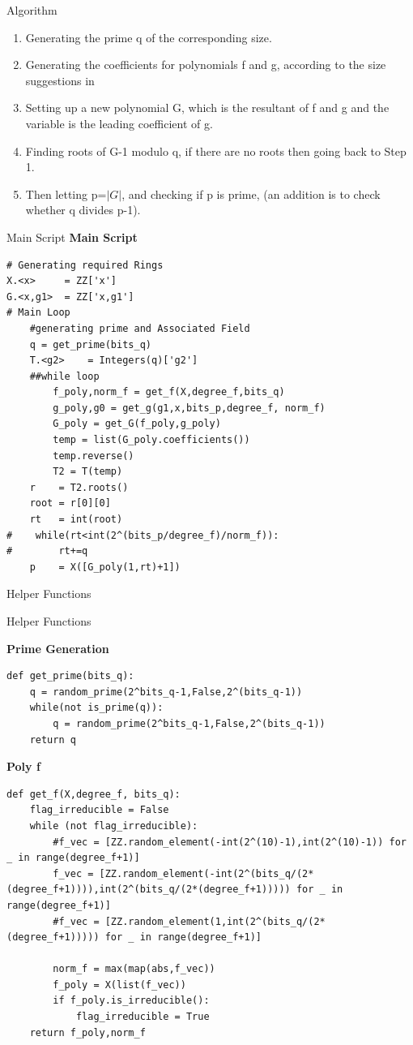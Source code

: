 \documentclass[10pt]{beamer}
\begin{document}
\begin{frame}[fragile]{Algorithm}
\begin{enumerate}
\item Generating the prime q of the corresponding size.
\item Generating the coefficients for polynomials f and g, according to the size suggestions in \cite{Paper} 
\item Setting up a new polynomial G, which is the resultant of f and g and the variable is the leading coefficient of g.
\item Finding roots of G-1 modulo q, if there are no roots then going back to Step 1. 
\item Then letting p=$|G|$, and checking if p is prime, (an addition is to check whether q divides p-1).
\end{enumerate}
\end{frame}
\begin{frame}[fragile]{Main Script}
\textbf{Main Script}
\begin{lstlisting}
# Generating required Rings
X.<x>     = ZZ['x']
G.<x,g1>  = ZZ['x,g1']
# Main Loop
    #generating prime and Associated Field
    q = get_prime(bits_q)
    T.<g2>    = Integers(q)['g2']
	##while loop
        f_poly,norm_f = get_f(X,degree_f,bits_q)
        g_poly,g0 = get_g(g1,x,bits_p,degree_f, norm_f)
        G_poly = get_G(f_poly,g_poly)
        temp = list(G_poly.coefficients())
        temp.reverse()
        T2 = T(temp)
    r    = T2.roots()
    root = r[0][0]
    rt   = int(root)
#    while(rt<int(2^(bits_p/degree_f)/norm_f)):
#        rt+=q
    p    = X([G_poly(1,rt)+1])
\end{lstlisting}
\end{frame}




\begin{frame}[fragile]{Helper Functions}
\begin{alertblock}{Helper Functions}\end{alertblock}
\textbf{Prime Generation}
\begin{lstlisting}
def get_prime(bits_q):
    q = random_prime(2^bits_q-1,False,2^(bits_q-1))
    while(not is_prime(q)):
        q = random_prime(2^bits_q-1,False,2^(bits_q-1))
    return q
 \end{lstlisting}
 \textbf{Poly f}
 \begin{lstlisting}
def get_f(X,degree_f, bits_q):
    flag_irreducible = False
    while (not flag_irreducible):
        #f_vec = [ZZ.random_element(-int(2^(10)-1),int(2^(10)-1)) for _ in range(degree_f+1)]
        f_vec = [ZZ.random_element(-int(2^(bits_q/(2*(degree_f+1)))),int(2^(bits_q/(2*(degree_f+1))))) for _ in range(degree_f+1)]
        #f_vec = [ZZ.random_element(1,int(2^(bits_q/(2*(degree_f+1))))) for _ in range(degree_f+1)]

        norm_f = max(map(abs,f_vec))
        f_poly = X(list(f_vec))
        if f_poly.is_irreducible():
            flag_irreducible = True
    return f_poly,norm_f
        \end{lstlisting}
\end{frame}
\end{document}
